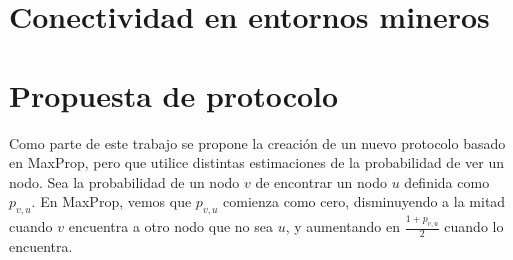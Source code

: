 \documentclass[10pt,preprint,onecolumn]{article}
\begin{document}
\begin{comment}



 
  \subsection{Información social}
  Se toma como hipótesis que los nodos de la red presentan ciertos patrones de comportamiento que influyen en su movilidad y sus contactos, por lo que se utiliza esta información para definir los roles de los nodos en la red desde una perspectiva social. Este tipo de estrategias requiere un conocimiento mayor de la topología donde se aplicará, puesto que su enrutamiento depende fuertemente de una correcta inferencia del contexto.





\newpage
\part*{Patrones de movilidad en DTNs}









\newpage
\part*{Modelo de movilidad en minas subterráneas}



\end{comment}

\newpage
\part*{Conectividad en entornos mineros}


\newpage
\part{Propuesta de protocolo}

Como parte de este trabajo se propone la creación de un nuevo protocolo basado en MaxProp, pero que utilice distintas estimaciones de la probabilidad de ver un nodo. Sea la probabilidad de un nodo $v$ de encontrar un nodo $u$ definida como $p_{v,u}$. En MaxProp, vemos que $p_{v,u}$ comienza como cero, disminuyendo a la mitad cuando $v$ encuentra a otro nodo que no sea $u$, y aumentando en $\frac{1+p_{v,u}}{2}$ cuando lo encuentra.
\end{document}
